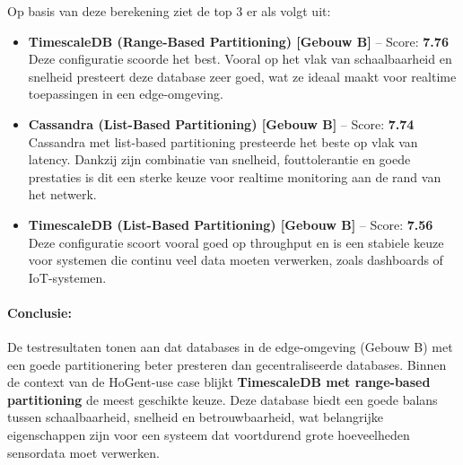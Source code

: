 Op basis van deze berekening ziet de top 3 er als volgt uit:

\begin{itemize}
    \item \textbf{TimescaleDB (Range-Based Partitioning) [Gebouw B]} – Score: \textbf{7.76}  
    Deze configuratie scoorde het best. Vooral op het vlak van schaalbaarheid en snelheid presteert deze database zeer goed, wat ze ideaal maakt voor realtime toepassingen in een edge-omgeving.

    \item \textbf{Cassandra (List-Based Partitioning) [Gebouw B]} – Score: \textbf{7.74}  
    Cassandra met list-based partitioning presteerde het beste op vlak van latency. Dankzij zijn combinatie van snelheid, fouttolerantie en goede prestaties is dit een sterke keuze voor realtime monitoring aan de rand van het netwerk.

    \item \textbf{TimescaleDB (List-Based Partitioning) [Gebouw B]} – Score: \textbf{7.56}  
    Deze configuratie scoort vooral goed op throughput en is een stabiele keuze voor systemen die continu veel data moeten verwerken, zoals dashboards of IoT-systemen.
\end{itemize}

\paragraph{Conclusie:}
De testresultaten tonen aan dat databases in de edge-omgeving (Gebouw B) met een goede partitionering beter presteren dan gecentraliseerde databases.  
Binnen de context van de HoGent-use case blijkt \textbf{TimescaleDB met range-based partitioning} de meest geschikte keuze. Deze database biedt een goede balans tussen schaalbaarheid, snelheid en betrouwbaarheid, wat belangrijke eigenschappen zijn voor een systeem dat voortdurend grote hoeveelheden sensordata moet verwerken.
